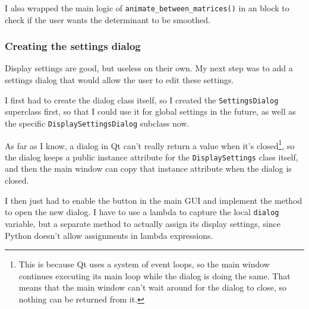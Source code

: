 \documentclass[../development.tex]{subfiles}
\begin{document}
I also wrapped the main logic of \texttt{animate\_between\_matrices()} in an  block to check if the user wants the determinant to be smoothed.


\subsubsection{Creating the settings dialog\label{development:adding-display-settings:creating-the-settings-dialog}}

Display settings are good, but useless on their own. My next step was to add a settings dialog that would allow the user to edit these settings.

I first had to create the dialog class itself, so I created the \texttt{SettingsDialog} superclass first, so that I could use it for global settings in the future, as well as the specific \texttt{DisplaySettingsDialog} subclass now.

As far as I know, a dialog in Qt can't really return a value when it's closed\footnote{This is because Qt uses a system of event loops, so the main window continues executing its main loop while the dialog is doing the same. That means that the main window can't wait around for the dialog to close, so nothing can be returned from it.}, so the dialog keeps a public instance attribute for the \texttt{DisplaySettings} class itself, and then the main window can copy that instance attribute when the dialog is closed.


I then just had to enable the button in the main GUI and implement the method to open the new dialog. I have to use a lambda to capture the local \texttt{dialog} variable, but a separate method to actually assign its display settings, since Python doesn't allow assignments in lambda expressions.


\end{document}
